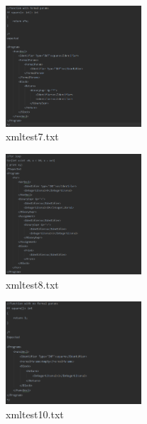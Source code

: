 \documentclass{article}
\begin{document}
\begin{multicols}{2}
					\begin{figure}[H]
					\centering
			 			\includegraphics[width=0.45\textwidth]{xmltest7.png}
			 			\centering
			  			\caption{xmltest7.txt}
			  			\label{fig:xmltest7}
					\end{figure}
					

					
					\begin{figure}[H]
					\centering
			 			\includegraphics[width=0.45\textwidth]{xmltest8.png}
			 			\centering
			  			\caption{xmltest8.txt}
			  			\label{fig:xmltest8}
					\end{figure}


					
					
												\begin{figure}[H]
					\centering
			 			\includegraphics[width=0.45\textwidth]{xmltest10.png}
			 			\centering
			  			\caption{xmltest10.txt}
			  			\label{fig:xmltest10}
					\end{figure}
					

\end{multicols}
\end{document}
